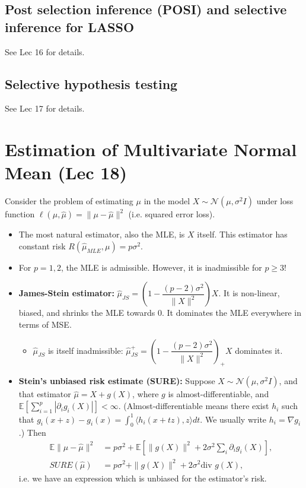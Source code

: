 \documentclass[twoside]{article}
\newcommand\dis{\displaystyle}
\newcommand\bbE{\mathbb{E}}
\newcommand\calN{\mathcal{N}}
\newcommand\sg{\sigma}
\begin{document}
\subsection{Post selection inference (POSI) and selective inference for LASSO}
See Lec 16 for details.

\subsection{Selective hypothesis testing}
See Lec 17 for details.

\section{Estimation of Multivariate Normal Mean (Lec 18)}
Consider the problem of estimating $\mu$ in the model $X \sim \calN(\mu, \sg^2 I)$ under loss function $\ell(\mu, \hat{\mu}) = \|\mu - \hat{\mu}\|^2$ (i.e. squared error loss).

\begin{itemize}
\item The most natural estimator, also the MLE, is $X$ itself. This estimator has constant risk $R(\hat{\mu}_{MLE}, \mu) = p\sg^2$.

\item For $p = 1,2$, the MLE is admissible. However, it is inadmissible for $p \geq 3$!

\item \textbf{James-Stein estimator:} $\hat{\mu}_{JS} = \left(1 - \dfrac{(p-2)\sg^2}{\|X\|^2}\right)X$. It is non-linear, biased, and shrinks the MLE towards $0$. It dominates the MLE everywhere in terms of MSE.

\begin{itemize}
\item $\hat{\mu}_{JS}$ is itself inadmissible: $\hat{\mu}_{JS}^+ = \left(1 - \dfrac{(p-2)\sg^2}{\|X\|^2}\right)_+ X$ dominates it.
\end{itemize}

\item \textbf{Stein's unbiased risk estimate (SURE):} Suppose $X \sim \calN(\mu, \sg^2 I)$, and that estimator $\hat{\mu} = X + g(X)$, where $g$ is almost-differentiable, and $\bbE \left[ \dis\sum_{i=1}^p |\partial_i g_i (X)| \right] < \infty$. (Almost-differentiable means there exist $h_i$ such that $g_i(x+z) - g_i(x) = \dis\int_0^1 \langle h_i(x + tz), z \rangle dt$. We usually write $h_i = \nabla g_i$.) Then
\begin{align*}
\bbE \|\mu - \hat{\mu}\|^2 &= p\sg^2 + \bbE \left[ \| g(X)\|^2 + 2\sg^2 \sum_i \partial_i g_i (X) \right], \\ 
SURE(\hat{\mu}) &= p\sg^2 + \|g(X)\|^2 + 2\sg^2 \text{div } g(X),
\end{align*}
i.e. we have an expression which is unbiased for the estimator's risk.

\end{itemize}
\end{document}
